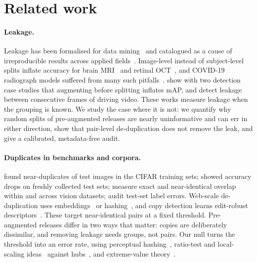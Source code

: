 \section{Related work}
\label{sec:related}

\paragraph{Leakage.}
Leakage has been formalised for data mining~\citep{kaufman2012leakage} and catalogued as a cause of irreproducible results across applied fields~\citep{kapoor2023leakage,lones2024pitfalls}. Image-level instead of subject-level splits inflate accuracy for brain MRI~\citep{yagis2021mri} and retinal OCT~\citep{tampu2022oct}, and COVID-19 radiograph models suffered from many such pitfalls~\citep{roberts2021pitfalls}. \citet{gerz2025augmentation} show with two detection case studies that augmenting before splitting inflates mAP, and \citet{babu2024automotive} detect leakage between consecutive frames of driving video. These works measure leakage when the grouping is known. We study the case where it is not: we quantify why random splits of pre-augmented releases are nearly uninformative and can err in either direction, show that pair-level de-duplication does not remove the leak, and give a calibrated, metadata-free audit.

\paragraph{Duplicates in benchmarks and corpora.}
\citet{barz2020cifair} found near-duplicates of test images in the CIFAR training sets; \citet{recht2019imagenet} showed accuracy drops on freshly collected test sets; \citet{ramos2025leakage} measure exact and near-identical overlap within and across vision datasets; \citet{northcutt2021pervasive} audit test-set label errors. Web-scale de-duplication uses embeddings~\citep{abbas2023semdedup,webster2023laion,oquab2024dinov2} or hashing~\citep{lee2022dedup}, and copy detection learns edit-robust descriptors~\citep{pizzi2022sscd}. These target near-identical pairs at a fixed threshold. Pre-augmented releases differ in two ways that matter: copies are deliberately dissimilar, and removing leakage needs groups, not pairs. Our null turns the threshold into an error rate, using perceptual hashing~\citep{zauner2010phash}, ratio-test and local-scaling ideas~\citep{lowe2004sift,conneau2018csls} against hubs~\citep{radovanovic2010hubs}, and extreme-value theory~\citep{coles2001evt}.
